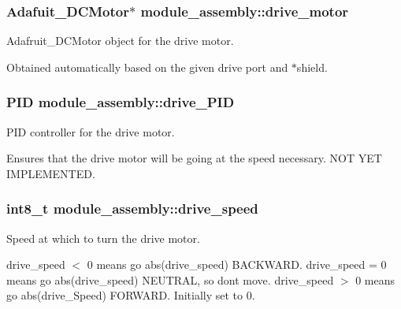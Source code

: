\subsubsection[{drive\+\_\+motor}]{\setlength{\rightskip}{0pt plus 5cm}Adafuit\+\_\+\+D\+C\+Motor$\ast$ module\+\_\+assembly\+::drive\+\_\+motor}\label{structmodule__assembly_a1c4ce1de4be6b0d640e508245ac5f281}


Adafruit\+\_\+\+D\+C\+Motor object for the drive motor. 

Obtained automatically based on the given drive port and $\ast$shield. \hypertarget{structmodule__assembly_ae46a075e88844adda6fd552f87f305c0}{}
\subsubsection[{drive\+\_\+\+P\+I\+D}]{\setlength{\rightskip}{0pt plus 5cm}P\+I\+D module\+\_\+assembly\+::drive\+\_\+\+P\+I\+D}\label{structmodule__assembly_ae46a075e88844adda6fd552f87f305c0}


P\+I\+D controller for the drive motor. 

Ensures that the drive motor will be going at the speed necessary. N\+O\+T Y\+E\+T I\+M\+P\+L\+E\+M\+E\+N\+T\+E\+D. \hypertarget{structmodule__assembly_a82019a65507cc9a23d7cdcff82adc20b}{}
\subsubsection[{drive\+\_\+speed}]{\setlength{\rightskip}{0pt plus 5cm}int8\+\_\+t module\+\_\+assembly\+::drive\+\_\+speed}\label{structmodule__assembly_a82019a65507cc9a23d7cdcff82adc20b}


Speed at which to turn the drive motor. 

drive\+\_\+speed $<$ 0 means go abs(drive\+\_\+speed) B\+A\+C\+K\+W\+A\+R\+D. drive\+\_\+speed = 0 means go abs(drive\+\_\+speed) N\+E\+U\+T\+R\+A\+L, so don\textquotesingle{}t move. drive\+\_\+speed $>$ 0 means go abs(drive\+\_\+\+Speed) F\+O\+R\+W\+A\+R\+D. Initially set to 0. \hypertarget{structmodule__assembly_a987ebb08eef885c780ce16cb747ad4b8}{}

